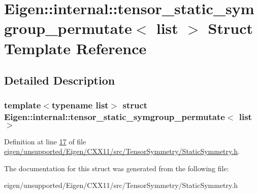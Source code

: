 \hypertarget{struct_eigen_1_1internal_1_1tensor__static__symgroup__permutate}{}\section{Eigen\+:\+:internal\+:\+:tensor\+\_\+static\+\_\+symgroup\+\_\+permutate$<$ list $>$ Struct Template Reference}
\label{struct_eigen_1_1internal_1_1tensor__static__symgroup__permutate}


\subsection{Detailed Description}
\subsubsection*{template$<$typename list$>$\newline
struct Eigen\+::internal\+::tensor\+\_\+static\+\_\+symgroup\+\_\+permutate$<$ list $>$}



Definition at line \hyperlink{eigen_2unsupported_2_eigen_2_c_x_x11_2src_2_tensor_symmetry_2_static_symmetry_8h_source_l00017}{17} of file \hyperlink{eigen_2unsupported_2_eigen_2_c_x_x11_2src_2_tensor_symmetry_2_static_symmetry_8h_source}{eigen/unsupported/\+Eigen/\+C\+X\+X11/src/\+Tensor\+Symmetry/\+Static\+Symmetry.\+h}.



The documentation for this struct was generated from the following file\+:\begin{DoxyCompactItemize}
\item 
eigen/unsupported/\+Eigen/\+C\+X\+X11/src/\+Tensor\+Symmetry/\+Static\+Symmetry.\+h\end{DoxyCompactItemize}
